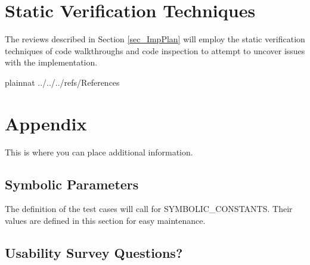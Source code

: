 \documentclass[12pt, titlepage]{article}
\begin{document}
\section{Static Verification Techniques} \label{sec_Static}

The reviews described in Section \ref{sec_ImpPlan} will employ the static 
verification techniques of code walkthroughs and code inspection to attempt to 
uncover issues with the implementation.
				
\newpage

 {plainnat}
 {../../../refs/References}

\newpage

\section{Appendix}

This is where you can place additional information.

\subsection{Symbolic Parameters}

The definition of the test cases will call for SYMBOLIC\_CONSTANTS.
Their values are defined in this section for easy maintenance.

\subsection{Usability Survey Questions?}

\end{document}
